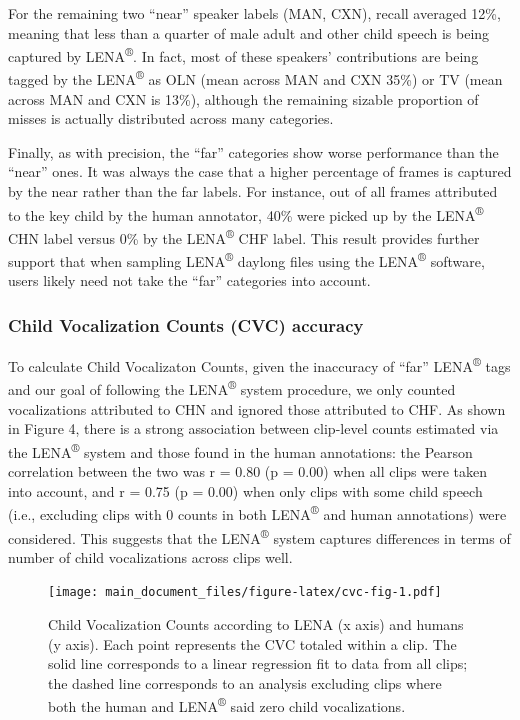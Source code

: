 \documentclass[english,floatsintext,man]{apa6}
\begin{document}
For the remaining two \enquote{near} speaker labels (MAN, CXN), recall
averaged 12\%, meaning that less than a quarter of male adult and other
child speech is being captured by LENA\textsuperscript{®}. In fact, most
of these speakers' contributions are being tagged by the
LENA\textsuperscript{®} as OLN (mean across MAN and CXN 35\%) or TV
(mean across MAN and CXN is 13\%), although the remaining sizable
proportion of misses is actually distributed across many categories.

Finally, as with precision, the \enquote{far} categories show worse
performance than the \enquote{near} ones. It was always the case that a
higher percentage of frames is captured by the near rather than the far
labels. For instance, out of all frames attributed to the key child by
the human annotator, 40\% were picked up by the LENA\textsuperscript{®}
CHN label versus 0\% by the LENA\textsuperscript{®} CHF label. This
result provides further support that when sampling
LENA\textsuperscript{®} daylong files using the LENA\textsuperscript{®}
software, users likely need not take the \enquote{far} categories into
account.

\subsubsection{Child Vocalization Counts (CVC)
accuracy}\label{child-vocalization-counts-cvc-accuracy}

To calculate Child Vocalizaton Counts, given the inaccuracy of
\enquote{far} LENA\textsuperscript{®} tags and our goal of following the
LENA\textsuperscript{®} system procedure, we only counted vocalizations
attributed to CHN and ignored those attributed to CHF. As shown in
Figure 4, there is a strong association between clip-level counts
estimated via the LENA\textsuperscript{®} system and those found in the
human annotations: the Pearson correlation between the two was r = 0.80
(p = 0.00) when all clips were taken into account, and r = 0.75 (p =
0.00) when only clips with some child speech (i.e., excluding clips with
0 counts in both LENA\textsuperscript{®} and human annotations) were
considered. This suggests that the LENA\textsuperscript{®} system
captures differences in terms of number of child vocalizations across
clips well.

\begin{figure}
\centering
\texttt{[image: main\_document\_files/figure-latex/cvc-fig-1.pdf]}
\caption{\label{fig:cvc-fig}Child Vocalization Counts according to LENA (x
axis) and humans (y axis). Each point represents the CVC totaled within
a clip. The solid line corresponds to a linear regression fit to data
from all clips; the dashed line corresponds to an analysis excluding
clips where both the human and LENA\textsuperscript{®} said zero child
vocalizations.}
\end{figure}
\end{document}
